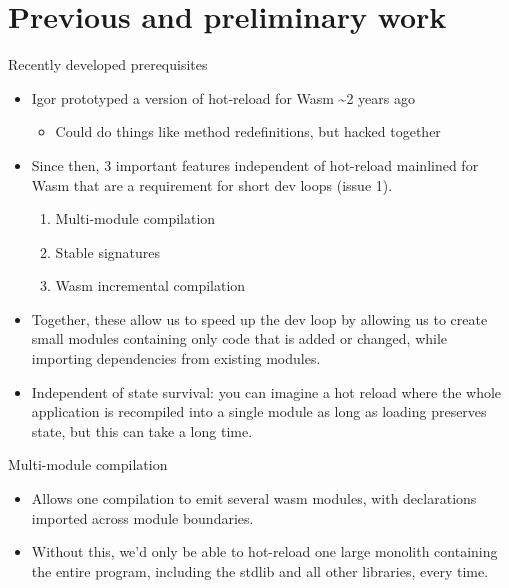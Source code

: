 \documentclass[10pt,presentation]{beamer}
\begin{document}
\section*{Previous and preliminary work}
\label{sec:org14f79e2}

\begin{frame}[label={sec:org8b951f4}]{Recently developed prerequisites}
\begin{itemize}
\item Igor prototyped a version of hot-reload for Wasm \textasciitilde{}2 years ago
\begin{itemize}
\item Could do things like method redefinitions, but hacked together
\end{itemize}
\item Since then, 3 important features independent of hot-reload mainlined
for Wasm that are a requirement for \alert{short dev loops} (issue 1).
\begin{enumerate}
\item \alert{Multi-module compilation}
\item \alert{Stable signatures}
\item \alert{Wasm incremental compilation}
\end{enumerate}
\item Together, these allow us to speed up the dev loop by allowing us to
create small modules containing only code that is added or changed,
while importing dependencies from existing modules.
\item Independent of state survival: you can imagine a hot reload where
the whole application is recompiled into a single module as long as
loading preserves state, but this can take a long time.
\end{itemize}
\end{frame}
\begin{frame}[label={sec:org2ce6482}]{Multi-module compilation}
\begin{itemize}
\item Allows one compilation to emit several wasm modules, with
declarations imported across module boundaries.
\item Without this, we'd only be able to hot-reload one large monolith
containing the entire program, including the stdlib and all other
libraries, every time.
\end{itemize}
\end{frame}
\end{document}
